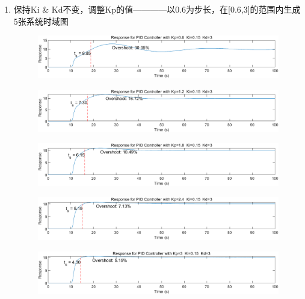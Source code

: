 \documentclass{thuemp}
\begin{document}
\begin{enumerate}
\item 保持Ki \& Kd不变，调整Kp的值————以0.6为步长，在[0.6,3]的范围内生成5张系统时域图
  \begin{figure}[H]
    \centering
    \includegraphics[width=1\linewidth]{./img/PID/id1.png}
  \end{figure}
  \begin{figure}[H]
    \centering
    \includegraphics[width=1\linewidth]{./img/PID/id2.png}
  \end{figure}
  \begin{figure}[H]
    \centering
    \includegraphics[width=1\linewidth]{./img/PID/id3.png}
  \end{figure}
  \begin{figure}[H]
    \centering
    \includegraphics[width=1\linewidth]{./img/PID/id4.png}
  \end{figure}
  \begin{figure}[H]
    \centering
    \includegraphics[width=1\linewidth]{./img/PID/id5.png}
  \end{figure}

\end{enumerate}
\end{document}
